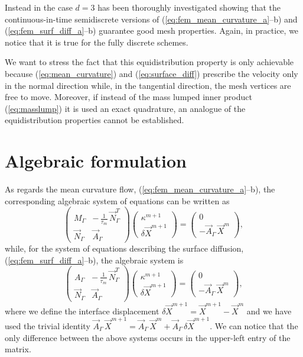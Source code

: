 Instead in \cite[\S4]{gflows3d} the case $d=3$ has been thoroughly investigated
showing that the continuous-in-time semidiscrete versions of
(\ref{eq:fem_mean_curvature_a}--b) and (\ref{eq:fem_surf_diff_a}--b) guarantee
good mesh properties. Again, in practice, we notice that it is true for the
fully discrete schemes.

We want to stress the fact that this equidistribution property is only
achievable because (\ref{eq:mean_curvature}) and (\ref{eq:surface_diff})
prescribe the velocity only in the normal direction while, in the tangential
direction, the mesh vertices are free to move. Moreover, if instead of the mass
lumped inner product (\ref{eq:masslump}) it is used an exact quadrature, an
analogue of the equidistribution properties cannot be established.

\section{Algebraic formulation}\label{sec:geometric_pdes_algebraic}
As regards the mean curvature flow, (\ref{eq:fem_mean_curvature_a}--b), the
corresponding algebraic system of equations can be written as
\begin{equation}\label{eq:algebraic_mean_curvature}
\begin{pmatrix}
M_\Gamma & -\,\frac{1}{\tau_m} \, \vec N_\Gamma^T \\
\vec N_\Gamma & \vec A_\Gamma
\end{pmatrix}
\begin{pmatrix}
\kappa^{m + 1} \\
\delta \vec X^{m + 1}
\end{pmatrix}
=
\begin{pmatrix}
0 \\
- \vec A_\Gamma \, \vec X^m
\end{pmatrix} ,
\end{equation}
while, for the system of equations describing the surface diffusion,
(\ref{eq:fem_surf_diff_a}--b), the algebraic system is
\begin{equation}\label{eq:algebraic_surf_diff}
\begin{pmatrix}
A_\Gamma & - \,\frac{1}{\tau_m}\, \vec N_\Gamma^T \\
\vec N_\Gamma & \vec A_\Gamma
\end{pmatrix}
\begin{pmatrix}
\kappa^{m + 1} \\
\delta \vec X^{m + 1}
\end{pmatrix}
=
\begin{pmatrix}
0 \\
- \vec A_\Gamma \, \vec X^m
\end{pmatrix},
\end{equation}
where we define the interface displacement $\delta \vec X^{m + 1}=\vec X^{m +
1} - \vec X^m$ and we have used the trivial identity $\vec A_\Gamma\,\vec
X^{m+1} = \vec A_\Gamma\,\vec X^m + \vec A_\Gamma\,\delta \vec X^{m+1}$. We can
notice that the only difference between the above systems occurs in the
upper-left entry of the matrix.

